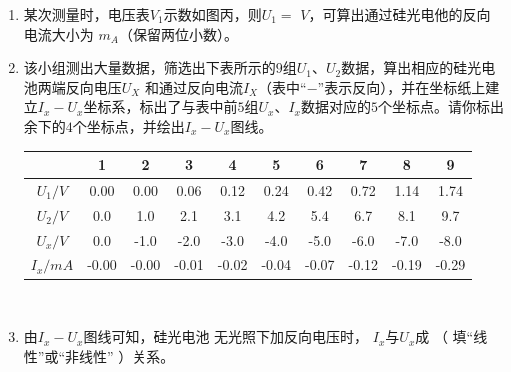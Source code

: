 \begin{enumerate}[leftmargin=0em]
\begin{enumerate}
\begin{enumerate}
\renewcommand{\labelenumi}{\arabic{enumi}.}
\item
某次测量时，电压表$ V_{1} $示数如图丙，则$ U_{1} = $  
 $ V $，可算出通过硅光电他的反向电流大小为  
 $ m_{A} $（保留两位小数）。
\item 
该小组测出大量数据，筛选出下表所示的$ 9 $组$ U_{1} $、$ U_{2} $数据，算出相应的硅光电池两端反向电压$ U_X $ 和通过反向电流$ I_X $（表中“$ - $”表示反向），并在坐标纸上建立$ I_x-U_x $坐标系，标出了与表中前$ 5 $组$ U_x $、$ I_x $数据对应的$ 5 $个坐标点。请你标出余下的$ 4 $个坐标点，并绘出$ I_x-U_x $图线。
\begin{table}[h!]
\centering 
\begin{tabular}{|c|c|c|c|c|c|c|c|c|c|}
\hline 
& 1 & 2 & 3 & 4 & 5 & 6 & 7 & 8 & 9
 \\
\hline
$ U_1/V $ & 0.00 & 0.00 & 0.06 & 0.12 & 0.24 & 0.42 & 0.72 & 1.14 & 1.74
 \\
\hline
$ U_2/V $ & 0.0 & 1.0 & 2.1 & 3.1 & 4.2 & 5.4 & 6.7 & 8.1 & 9.7
 \\
\hline
$ U_x/V $ & 0.0 & -1.0 & -2.0 & -3.0 & -4.0 & -5.0 & -6.0 & -7.0 & -8.0
 \\
\hline
$ I_x/mA $ & -0.00 & -0.00 & -0.01 & -0.02 & -0.04 & -0.07 & -0.12 & -0.19 & -0.29\\ 
\hline 
\end{tabular}\\
 
\end{table} 

\item 
由$ I_x-U_x $图线可知，硅光电池 无光照下加反向电压时， $ I_x $与$ U_x $成  
（ 填“线性”或“非线性” ）关系。



\end{enumerate}




\end{enumerate}




\end{enumerate}
